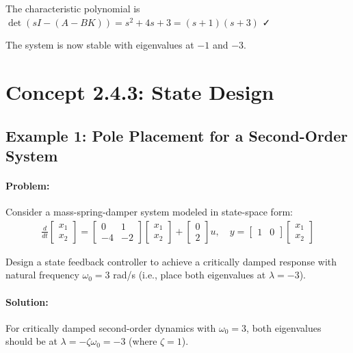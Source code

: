 \documentclass[11pt,a4paper]{article}
\begin{document}
The characteristic polynomial is $\det(sI - (A-BK)) = s^2 + 4s + 3 = (s+1)(s+3)$ ✓

The system is now stable with eigenvalues at $-1$ and $-3$.

\section{Concept 2.4.3: State Design}

\subsection{Example 1: Pole Placement for a Second-Order System}

\paragraph{Problem:} Consider a mass-spring-damper system modeled in state-space form:
\begin{align}
\frac{d}{dt}\begin{bmatrix} x_1 \\ x_2 \end{bmatrix} = \begin{bmatrix} 0 & 1 \\ -4 & -2 \end{bmatrix}\begin{bmatrix} x_1 \\ x_2 \end{bmatrix} + \begin{bmatrix} 0 \\ 2 \end{bmatrix}u, \quad y = \begin{bmatrix} 1 & 0 \end{bmatrix}\begin{bmatrix} x_1 \\ x_2 \end{bmatrix}
\end{align}

Design a state feedback controller to achieve a critically damped response with natural frequency $\omega_0 = 3$ rad/s (i.e., place both eigenvalues at $\lambda = -3$).

\paragraph{Solution:}

For critically damped second-order dynamics with $\omega_0 = 3$, both eigenvalues should be at $\lambda = -\zeta\omega_0 = -3$ (where $\zeta = 1$).
\end{document}
